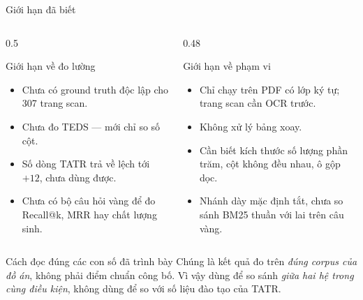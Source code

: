 \documentclass[aspectratio=169,11pt]{beamer}
\newcommand{\src}[1]{{\footnotesize\ttfamily #1}}
\begin{document}
\begin{frame}{Giới hạn đã biết}
  \begin{columns}[T]
    \begin{column}{0.5\textwidth}
      \begin{block}{\small Giới hạn về đo lường}
        \begin{itemize}\footnotesize
          \item Chưa có ground truth độc lập cho 307 trang scan.
          \item Chưa đo TEDS --- mới chỉ so số cột.
          \item Số dòng TATR trả về lệch tới $+12$, chưa dùng được.
          \item Chưa có bộ câu hỏi vàng để đo \src{Recall@k}, MRR hay chất lượng sinh.
        \end{itemize}
      \end{block}
    \end{column}
    \begin{column}{0.48\textwidth}
      \begin{block}{\small Giới hạn về phạm vi}
        \begin{itemize}\footnotesize
          \item Chỉ chạy trên PDF có lớp ký tự; trang scan cần OCR trước.
          \item Không xử lý bảng xoay.
          \item Cần biết kích thước số lượng phần trăm, cột không đều nhau, ô gộp dọc.
          \item Nhánh dày mặc định tắt, chưa so sánh BM25 thuần với lai trên câu vàng.
        \end{itemize}
      \end{block}
    \end{column}
  \end{columns}
  \vspace{0.3em}
  \begin{alertblock}{\small Cách đọc đúng các con số đã trình bày}
    Chúng là kết quả đo trên \emph{đúng corpus của đồ án}, không phải điểm chuẩn
    công bố. Vì vậy dùng để so sánh \emph{giữa hai hệ trong cùng điều kiện},
    không dùng để so với số liệu đào tạo của TATR.
  \end{alertblock}
\end{frame}
\end{document}
